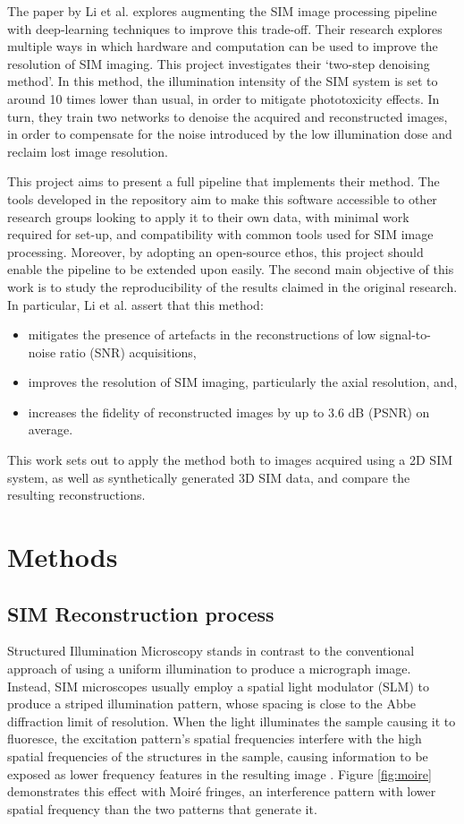 \documentclass[12pt]{article}
\begin{document}
The paper by Li et al. \cite{keypaper} explores augmenting the SIM image processing pipeline with deep-learning techniques to improve this trade-off.
Their research explores multiple ways in which hardware and computation can be used to improve the resolution of SIM imaging.
This project investigates their `two-step denoising method'.
In this method, the illumination intensity of the SIM system is set to around 10 times lower than usual,
in order to mitigate phototoxicity effects.
In turn, they train two networks to denoise the acquired and reconstructed images,
in order to compensate for the noise introduced by the low illumination dose and reclaim lost image resolution.

This project aims to present a full pipeline that implements their method.
The tools developed in the repository aim to make this software accessible to other research groups looking to apply it to their own data,
with minimal work required for set-up, and compatibility with common tools used for SIM image processing.
Moreover, by adopting an open-source ethos, this project should enable the pipeline to be extended upon easily.
The second main objective of this work is to study the reproducibility of the results claimed in the original research.
In particular, Li et al. assert that this method:
\begin{itemize}
    \item mitigates the presence of artefacts in the reconstructions of low signal-to-noise ratio (SNR) acquisitions,
    \item improves the resolution of SIM imaging, particularly the axial resolution, and,
    \item increases the fidelity of reconstructed images by up to 3.6 dB (PSNR) on average\cite{keypaper}.
\end{itemize}
This work sets out to apply the method both to images acquired using a 2D SIM system,
as well as synthetically generated 3D SIM data, and compare the resulting reconstructions.

\section{Methods}

\subsection{SIM Reconstruction process}

Structured Illumination Microscopy stands in contrast to the conventional approach of using a uniform illumination to produce a micrograph image.
Instead, SIM microscopes usually employ a spatial light modulator (SLM) to produce a striped illumination pattern,
whose spacing is close to the Abbe diffraction limit of resolution.
When the light illuminates the sample causing it to fluoresce,
the excitation pattern's spatial frequencies interfere with the high spatial frequencies of the structures in the sample,
causing information to be exposed as lower frequency features in the resulting image \cite{originalSIM}.
Figure \ref{fig:moire} demonstrates this effect with Moir\'{e} fringes,
an interference pattern with lower spatial frequency than the two patterns that generate it.
\end{document}
